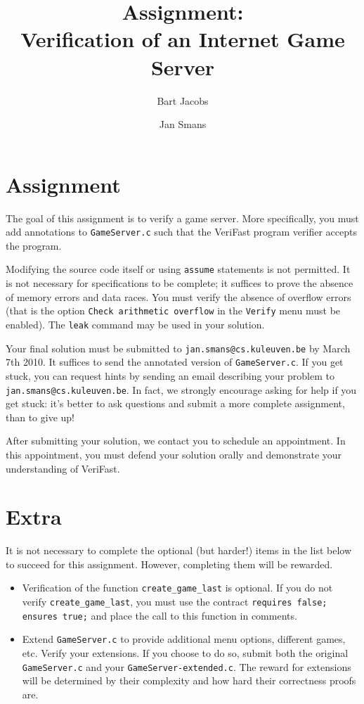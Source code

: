 \documentclass{article}
\title{Assignment:\\
Verification of an Internet Game Server}
\author{Bart Jacobs \and Jan Smans}
\date{}
\begin{document}
\maketitle

\section{Assignment}
The goal of this assignment is to verify a game server. More specifically, you must add annotations to \texttt{GameServer.c} such that the VeriFast program verifier accepts the program. 

Modifying the source code itself or using \texttt{assume} statements is not permitted. It is not necessary for specifications to be complete; it suffices to prove the absence of memory errors and data races. You must verify the absence of overflow errors (that is the option \texttt{Check arithmetic overflow} in the \texttt{Verify} menu must be enabled). The \texttt{leak} command may be used in your solution.

Your final solution must be submitted to \texttt{jan.smans@cs.kuleuven.be} by March 7th 2010. It suffices to send the annotated version of \texttt{GameServer.c}. If you get stuck, you can request hints by sending an email describing your problem to \texttt{jan.smans@cs.kuleuven.be}. In fact, we strongly encourage asking for help if you get stuck: it's better to ask questions and submit a more complete assignment, than to give up!

After submitting your solution, we contact you to schedule an appointment. In this appointment, you must defend your solution orally and demonstrate your understanding of VeriFast.

\section{Extra}
It is not necessary to complete the optional (but harder!) items in the list below to succeed for this assignment. However, completing them will be rewarded.

\begin{itemize}
  \item Verification of the function \texttt{create\_game\_last} is optional. If you do not verify \texttt{create\_game\_last}, you must use the contract \texttt{requires false; ensures true;} and place the call to this function in comments.
  \item Extend \texttt{GameServer.c} to provide additional menu options, different games, etc. Verify your extensions. If you choose to do so, submit both the original \texttt{GameServer.c} and your \texttt{GameServer-extended.c}. The reward for extensions will be determined by their complexity and how hard their correctness proofs are.
\end{itemize}
\end{document}
